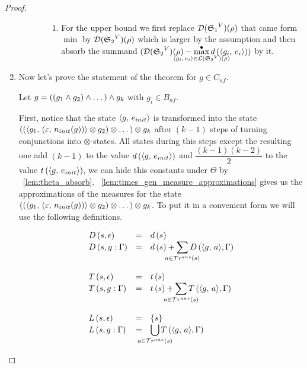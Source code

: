 \begin{proof}
\begin{enumerate}
\begin{enumerate}
\begin{enumerate}
\begin{enumerate}
			\item For the upper bound we first replace $\mathcal{D}({\mathfrak{S}_1}^{V})(\rho)$ that came form $\min$ by $\mathcal{D}({\mathfrak{S}_2}^{V})(\rho)$ which is larger by the assumption and then absorb the summand $(\mathcal{D}(\schemewithvset{\mathfrak{S}_2}{V})(\rho) - \smashoperator{\maxd\limits_{\taskst{g_i}{e_i} \in \mathcal{L}(\schemewithvset{\mathfrak{S}_2}{V})(\rho)}} d\,(\taskst{g_i}{e_i}))$ by it.
			
			\end{enumerate}		
   		\end{enumerate}
	\end{enumerate}

\item Now let's prove the statement of the theorem for $g \in C_{nf}$.

Let $g = { ((g_1 \land g_2) \land \dots) \land g_k }$ with $g_i \in B_{nf}$.

First, notice that the state $\langle g ,\, e_{init} \rangle$ is transformed into the state \\ ${ ((\langle g_1 ,\, (\varepsilon ,\, n_{init}(g)) \rangle \otimes g_2) \otimes \dots) \otimes g_k }$ after $(k - 1)$ steps of turning conjunctions into $\otimes$-states. All states during this steps except the resulting one add $(k - 1)$ to the value $d\,(\langle g ,\, e_{init} \rangle)$ and $\dfrac{(k - 1)(k - 2)}{2}$ to the value $t\,(\langle g ,\, e_{init} \rangle)$, we can hide this constants under $\Theta$ by \lemmaword~\ref{lem:theta_absorb}. \lemmaword~\ref{lem:times_gen_measure_approximations} gives us the approximations of the measures for the state ${ ((\langle g_1 ,\, (\varepsilon ,\, n_{init}(g)) \rangle \otimes g_2) \otimes \dots) \otimes g_k }$. To put it in a convenient form we will use the following definitions.

\[ \begin{array}{lcl}
D\,(s, \epsilon) & = & d\,(s) \\
D\,(s, g : \Gamma) & = & d\,(s) + \smashoperator{\sum\limits_{a \in \tra{s}}} D\,(\taskst{g}{a}, \Gamma) \\
\\
T\,(s, \epsilon) & = & t\,(s) \\
T\,(s, g : \Gamma) & = & t\,(s) + \smashoperator{\sum\limits_{a \in \tra{s}}} T\,(\taskst{g}{a}, \Gamma) \\
\\
L\,(s, \epsilon) & = & \{ s \} \\
L\,(s, g : \Gamma) & = & \smashoperator{\bigcup\limits_{a \in \tra{s}}} T\,(\taskst{g}{a}, \Gamma) \\
\end{array}
\]


\end{enumerate}
\end{proof}
